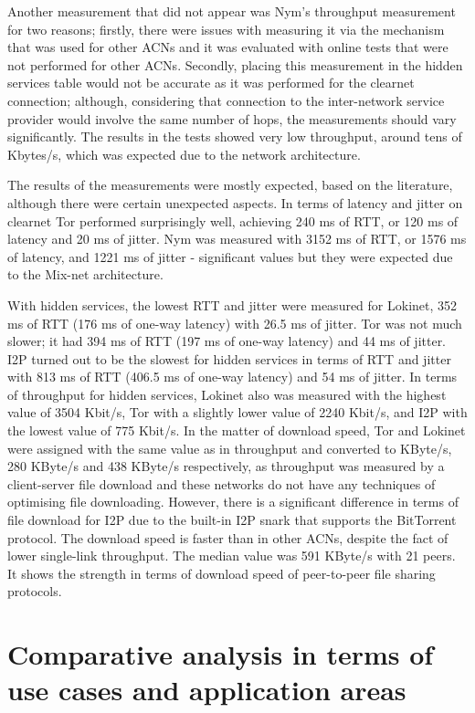 Another measurement that did not appear was Nym's throughput measurement for two reasons; firstly, there were issues with measuring it via the mechanism that was used for other ACNs and it was evaluated with online tests that were not performed for other ACNs. Secondly, placing this measurement in the hidden services table would not be accurate as it was performed for the clearnet connection; although, considering that connection to the inter-network service provider would involve the same number of hops, the measurements should vary significantly. The results in the tests showed very low throughput, around tens of Kbytes/s, which was expected due to the network architecture. 

The results of the measurements were mostly expected, based on the literature, although there were certain unexpected aspects.
In terms of latency and jitter on clearnet Tor performed surprisingly well, achieving 240 ms of RTT, or 120 ms of latency and 20 ms of jitter. Nym was measured with 3152 ms of RTT, or 1576 ms of latency, and 1221 ms of jitter - significant values but they were expected due to the Mix-net architecture.

With hidden services, the lowest RTT and jitter were measured for Lokinet, 352 ms of RTT (176 ms of one-way latency) with 26.5 ms of jitter. Tor was not much slower; it had 394 ms of RTT (197 ms of one-way latency) and 44 ms of jitter. I2P turned out to be the slowest for hidden services in terms of RTT and jitter with 813 ms of RTT (406.5 ms of one-way latency) and 54 ms of jitter. In terms of throughput for hidden services, Lokinet also was measured with the highest value of 3504 Kbit/s, Tor with a slightly lower value of 2240 Kbit/s, and I2P with the lowest value of 775 Kbit/s. In the matter of download speed, Tor and Lokinet were assigned with the same value as in throughput and converted to KByte/s, 280 KByte/s and 438 KByte/s respectively, as throughput was measured by a client-server file download and these networks do not have any techniques of optimising file downloading. However, there is a significant difference in terms of file download for I2P due to the built-in I2P snark that supports the BitTorrent protocol. The download speed is faster than in other ACNs, despite the fact of lower single-link throughput. The median value was 591 KByte/s with 21 peers. It shows the strength in terms of download speed of peer-to-peer file sharing protocols.


\section{Comparative analysis in terms of use cases and application areas}

